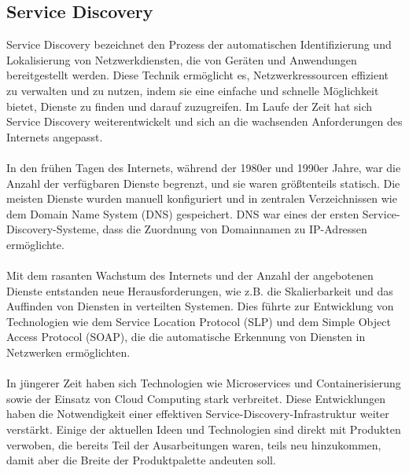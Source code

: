 \documentclass[../vs-script-first-v01.tex]{subfiles}
\begin{document}
\subsection{Service Discovery}

Service Discovery bezeichnet den Prozess der automatischen Identifizierung und Lokalisierung von Netzwerkdiensten, die von Geräten und Anwendungen bereitgestellt werden. Diese Technik ermöglicht es, Netzwerkressourcen effizient zu verwalten und zu nutzen, indem sie eine einfache und schnelle Möglichkeit bietet, Dienste zu finden und darauf zuzugreifen. Im Laufe der Zeit hat sich Service Discovery weiterentwickelt und sich an die wachsenden Anforderungen des Internets angepasst.
\\\\
In den frühen Tagen des Internets, während der 1980er und 1990er Jahre, war die Anzahl der verfügbaren Dienste begrenzt, und sie waren größtenteils statisch. Die meisten Dienste wurden manuell konfiguriert und in zentralen Verzeichnissen wie dem Domain Name System (DNS) gespeichert. DNS war eines der ersten Service-Discovery-Systeme, dass die Zuordnung von Domainnamen zu IP-Adressen ermöglichte.
\\\\
Mit dem rasanten Wachstum des Internets und der Anzahl der angebotenen Dienste entstanden neue Herausforderungen, wie z.B. die Skalierbarkeit und das Auffinden von Diensten in verteilten Systemen. Dies führte zur Entwicklung von Technologien wie dem Service Location Protocol (SLP) und dem Simple Object Access Protocol (SOAP), die die automatische Erkennung von Diensten in Netzwerken ermöglichten.
\\\\
In jüngerer Zeit haben sich Technologien wie Microservices und Containerisierung sowie der Einsatz von Cloud Computing stark verbreitet. Diese Entwicklungen haben die Notwendigkeit einer effektiven Service-Discovery-Infrastruktur weiter verstärkt. Einige der aktuellen Ideen und Technologien sind direkt mit Produkten verwoben, die bereits Teil der Ausarbeitungen waren, teils neu hinzukommen, damit aber die Breite der Produktpalette andeuten soll.
\end{document}

